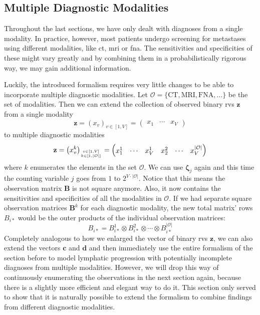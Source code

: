 \documentclass[\relativeRoot/main.tex]{subfiles}
\begin{document}
\subsection{Multiple Diagnostic Modalities}
\label{subsec:unilateral:formalism:multimodality}

Throughout the last sections, we have only dealt with diagnoses from a single modality. In practice, however, most patients undergo screening for metastases using different modalities, like \gls{ct}, \gls{mri} or \gls{fna}. The sensitivities and specificities of these might vary greatly and by combining them in a probabilistically rigorous way, we may gain additional information.

Luckily, the introduced formalism requires very little changes to be able to incorporate multiple diagnostic modalities. Let $\mathcal{O} = \{ \text{CT}, \text{MRI}, \text{FNA}, \ldots \}$ be the set of modalities. Then we can extend the collection of observed binary \glspl{rv} $\mathbf{z}$ from a single modality
%
\begin{equation}
    \mathbf{z} = \left( x_v \right)_{v \in [1,V]} =
    \begin{pmatrix}
        x_1 & \cdots & x_V
    \end{pmatrix}
\end{equation}
%
to multiple diagnostic modalities
%
\begin{equation}
    \mathbf{z} = \left( x_v^k \right)_{v \in [1,V] \atop k \in [1, |\mathcal{O}|]} =
    \begin{pmatrix}
        x_1^1 & \cdots & x_V^1 & x_2^2 & \cdots & x_V^{|\mathcal{O}|}
    \end{pmatrix}
\end{equation}
%
where $k$ enumerates the elements in the set $\mathcal{O}$. We can use $\boldsymbol{\zeta}_j$ again and this time the counting variable $j$ goes from $1$ to $2^{V \cdot |\mathcal{O}|}$. Notice that this means the observation matrix $\mathbf{B}$ is not square anymore. Also, it now contains the sensitivities and specificities of all the modalities in $\mathcal{O}$. If we had separate square observation matrices $\mathbf{B}^k$ for each diagnostic modality, the new total matrix' rows $B_{i*}$ would be the outer products of the individual observation matrices:
%
\begin{equation}
    B_{i*} = B_{i*}^1 \otimes B_{i*}^2 \otimes \cdots \otimes B_{i*}^{|\mathcal{O}|}
\end{equation}
%
Completely analogous to how we enlarged the vector of binary \glspl{rv} $\mathbf{z}$, we can also extend the vectors $\mathbf{c}$ and $\mathbf{d}$ and then immediately use the entire formalism of the section before to model lymphatic progression with potentially incomplete diagnoses from multiple modalities. However, we will drop this way of continuously enumerating the observations in the next section again, because there is a slightly more efficient and elegant way to do it. This section only served to show that it is naturally possible to extend the formalism to combine findings from different diagnostic modalities.
\end{document}
